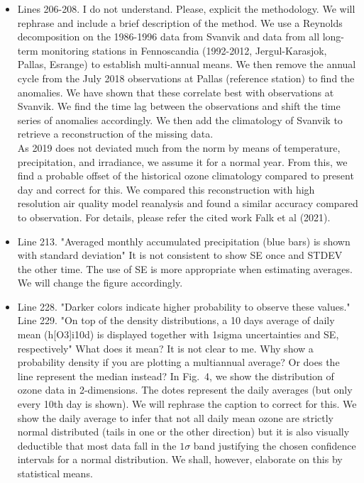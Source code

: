 \documentclass{scrartcl}
\begin{document}
\begin{itemize}
\item {\color{blue}Lines 206-208. I do not understand. Please, explicit the methodology.}
We will rephrase and include a brief description of the method. We use a Reynolds decomposition on the 1986-1996 data from Svanvik and data from all long-term monitoring stations in Fennoscandia (1992-2012, Jergul-Karasjok, Pallas, Esrange) to establish multi-annual means. We then remove the annual cycle from the July 2018 observations at Pallas (reference station) to find the anomalies. We have shown that these correlate best with observations at Svanvik. We find the time lag between the observations and shift the time series of anomalies accordingly. We then add the climatology of Svanvik to retrieve a reconstruction of the missing data.\\
As 2019 does not deviated much from the norm by means of temperature, precipitation, and irradiance, we assume it for a normal year. From this, we find a probable offset of the historical ozone climatology compared to present day and correct for this. We compared this reconstruction with high resolution air quality model reanalysis and found a similar accuracy compared to observation. For details, please refer the cited work Falk et al (2021).

\item {\color{blue}Line 213. "Averaged monthly accumulated precipitation (blue bars) is shown with standard deviation" It is not consistent to show SE once and STDEV the other time. The use of SE is more appropriate when estimating averages.}
We will change the figure accordingly.

\item {\color{blue}Line 228. "Darker colors indicate higher probability to observe these values."\\Line 229. "On top of the density distributions, a 10 days average of daily mean (h[O3]i10d) is displayed together with 1sigma uncertainties and SE, respectively" What does it mean? It is not clear to me. Why show a probability density if you are plotting a multiannual average? Or does the line represent the median instead?} In Fig.~4, we show the distribution of ozone data in 2-dimensions. The dotes represent the daily averages (but only every 10th day is shown). We will rephrase the caption to correct for this. We show the daily average to infer that not all daily mean ozone are strictly normal distributed (tails in one or the other direction) but it is also visually deductible that most data fall in the $1\sigma$ band justifying the chosen confidence intervals for a normal distribution. We shall, however, elaborate on this by statistical means.


\end{itemize}
\end{document}
